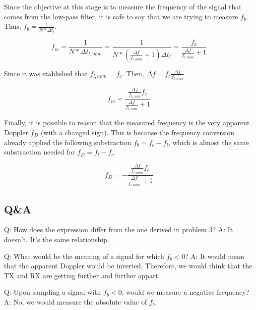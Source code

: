 Since the objective at this stage is to measure the frequency of the signal that
comes from the low-pass filter, it is safe to say that we are trying to measure
$f_b$. Thus, $f_b = \frac{1}{N*\Delta t_l}$.

\begin{equation}
	f_m = \frac{1}{N * \Delta t_{l,nom}}
	= \frac{1}{N *(\frac{\Delta f}{f_{l,nom}} + 1) \Delta t_l}
	= \frac{f_b}{\frac{\Delta f}{f_{l,nom}} + 1}
\end{equation}

Since it was stablished that $f_{l,nom} = f_c$.
Then, $\Delta f = f_c \frac{\Delta f}{f_{l,nom}}$

\begin{equation}
	f_m = \frac{\frac{\Delta f}{f_{l,nom}} f_c}{\frac{\Delta f}{f_{l,nom}} + 1}
\end{equation}

Finally, it is possible to reason that the measured frequency is the very
apparent Doppler $f_D$ (with a changed sign). This is because the frequency
conversion already applied the following substraction $f_b = f_c - f_l$, which
is almost the same substraction needed for $f_D = f_l - f_c$.

\begin{equation}
	f_D = -\frac{\frac{\Delta f}{f_{l,nom}} f_c}{\frac{\Delta f}{f_{l,nom}} + 1}
\end{equation}


\subsection{Q\&A}

Q: How does the expression differ from the one derived in problem 3?
A: It doesn't. It's the same relationship.

Q: What would be the meaning of a signal for which $f_b < 0$?
A: It would mean that the apparent Doppler would be inverted. Therefore, we
would think that the TX and RX are getting further and further appart.

Q: Upon sampling a signal with $f_b < 0$, would we measure a negative frequency?
A: No, we would measure the absolute value of $f_b$.

